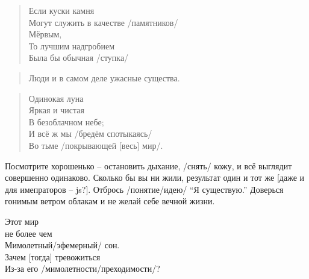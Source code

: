 \begin{ver}
  \begin{quote}
    \begin{verses}
      Если куски камня\\
      Могут служить в качестве /памятников/\\
      Мёрвым,\\
      То лучшим надгробием\\
      Была бы обычная /ступка/
    \end{verses}
  \end{quote}
\end{ver}

\begin{ver}
  \begin{quote}
    Люди и в самом деле ужасные существа.
  \end{quote}
\end{ver}

\begin{ver}
  \begin{quote}
    \begin{verses}
      Одинокая луна\\
      Яркая и чистая\\
      В безоблачном небе;\\
      И всё ж мы /бредём спотыкаясь/\\
      Во тьме /покрывающей [весь] мир/.
    \end{verses}
  \end{quote}
\end{ver}

\begin{ver}
  Посмотрите хорошенько -- остановить дыхание, /снять/
  кожу, и всё выглядит совершенно одинаково. Сколько бы вы ни жили,
  результат один и тот же [даже и для имепраторов -- js?]. Отбрось
  /понятие/идею/ ``Я существую.'' Доверься гонимым ветром
  облакам и не желай себе вечной жизни. 
\end{ver}

\begin{ver}
  \begin{verses}
    Этот мир\\
    не более чем\\
    Мимолетный/эфемерный/ сон.\\
    Зачем [тогда] тревожиться\\
    Из-за его /мимолетности/преходимости/?
  \end{verses}
\end{ver}


